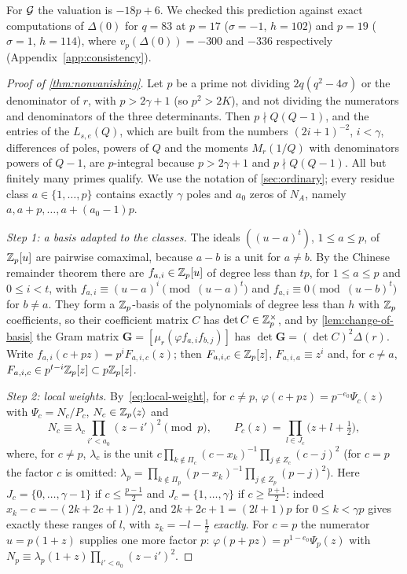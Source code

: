 For $\mathcal{G}$ the valuation is $-18p+6$. We checked this prediction against exact computations of
$\Delta(0)$ for $q=83$ at $p=17$ ($\sigma=-1$, $h=102$) and $p=19$ ($\sigma=1$, $h=114$), where
$v_p(\Delta(0))=-300$ and $-336$ respectively (Appendix~\ref{app:consistency}).

\begin{proof}[Proof of \cref{thm:nonvanishing}]
Let $p$ be a prime not dividing $2q(q^2-4\sigma)$ or the denominator of $r$, with $p>2\gamma+1$
(so $p^2>2K$), and not dividing the numerators and denominators of the three determinants. Then $p\nmid
Q(Q-1)$, and the entries of the $L_{s,e}(Q)$, which are built from the numbers $(2i+1)^{-2}$,
$i<\gamma$, differences of poles, powers of $Q$ and the moments $M_r(1/Q)$ with denominators
powers of $Q-1$, are $p$-integral because $p>2\gamma+1$ and $p\nmid Q(Q-1)$. All but finitely
many primes qualify. We use the
notation of \cref{sec:ordinary}; every residue class $a\in\{1,\dots,p\}$ contains exactly
$\gamma$ poles and $a_0$ zeros of $N_A$, namely $a,a+p,\dots,a+(a_0-1)p$.

\emph{Step 1: a basis adapted to the classes.} The ideals $((u-a)^t)$, $1\le a\le p$, of
$\mathbb{Z}_p[u]$ are pairwise comaximal, because $a-b$ is a unit for $a\ne b$. By the Chinese remainder
theorem there are $f_{a,i}\in\mathbb{Z}_p[u]$ of degree less than $tp$, for $1\le a\le p$ and $0\le
i<t$, with $f_{a,i}\equiv(u-a)^i\pmod{(u-a)^t}$ and $f_{a,i}\equiv0\pmod{(u-b)^t}$ for $b\ne a$.
They form a $\mathbb{Z}_p$-basis of the polynomials of degree less than $h$ with $\mathbb{Z}_p$ coefficients, so
their coefficient matrix $C$ has $\det C\in\mathbb{Z}_p^\times$, and by \cref{lem:change-of-basis} the
Gram matrix $\mathbf G=[\mu_r(\varphi f_{a,i}f_{b,j})]$ has $\det\mathbf G=(\det C)^2\Delta(r)$.
Write $f_{a,i}(c+pz)=p^iF_{a,i,c}(z)$; then $F_{a,i,c}\in\mathbb{Z}_p[z]$, $F_{a,i,a}\equiv z^i$ and,
for $c\ne a$, $F_{a,i,c}\in p^{t-i}\mathbb{Z}_p[z]\subset p\mathbb{Z}_p[z]$.

\emph{Step 2: local weights.} By~\eqref{eq:local-weight}, for $c\ne p$,
$\varphi(c+pz)=p^{-e_0}\Psi_c(z)$ with $\Psi_c=N_c/P_c$, $N_c\in\mathbb{Z}_p\langle z\rangle$ and
\[
  N_c\equiv\lambda_c\prod_{i'<a_0}(z-i')^2\pmod p,\qquad
  P_c(z)=\prod_{l\in J_c}\bigl(z+l+\tfrac12\bigr),
\]
where, for $c\ne p$, $\lambda_c$ is the unit $c\prod_{k\notin\Pi_c}(c-x_k)^{-1}\prod_{j\notin Z_c}(c-j)^2$
(for $c=p$ the factor $c$ is omitted: $\lambda_p=\prod_{k\notin\Pi_p}(p-x_k)^{-1}\prod_{j\notin Z_p}(p-j)^2$).
Here $J_c=\{0,\dots,\gamma-1\}$ if $c\le\frac{p-1}2$ and $J_c=\{1,\dots,\gamma\}$ if
$c\ge\frac{p+1}2$: indeed $x_k-c=-(2k+2c+1)/2$, and $2k+2c+1=(2l+1)p$ for $0\le k<\gamma p$ gives
exactly these ranges of $l$, with $z_k=-l-\frac12$ \emph{exactly}. For $c=p$ the numerator
$u=p(1+z)$ supplies one more factor $p$: $\varphi(p+pz)=p^{1-e_0}\Psi_p(z)$ with
$N_p\equiv\lambda_p(1+z)\prod_{i'<a_0}(z-i')^2$.


\end{proof}

